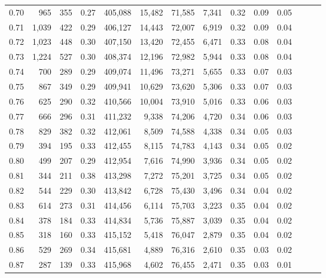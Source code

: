 \begin{tabular}{rrrrrrrrrrrrrr}
0.70 &     965 &    355 &  0.27 &  405,088 &   15,482 &  71,585 &   7,341 &  0.32 &  0.09 &      0.05 \\
0.71 &   1,039 &    422 &  0.29 &  406,127 &   14,443 &  72,007 &   6,919 &  0.32 &  0.09 &      0.04 \\
0.72 &   1,023 &    448 &  0.30 &  407,150 &   13,420 &  72,455 &   6,471 &  0.33 &  0.08 &      0.04 \\
0.73 &   1,224 &    527 &  0.30 &  408,374 &   12,196 &  72,982 &   5,944 &  0.33 &  0.08 &      0.04 \\
0.74 &     700 &    289 &  0.29 &  409,074 &   11,496 &  73,271 &   5,655 &  0.33 &  0.07 &      0.03 \\
0.75 &     867 &    349 &  0.29 &  409,941 &   10,629 &  73,620 &   5,306 &  0.33 &  0.07 &      0.03 \\
0.76 &     625 &    290 &  0.32 &  410,566 &   10,004 &  73,910 &   5,016 &  0.33 &  0.06 &      0.03 \\
0.77 &     666 &    296 &  0.31 &  411,232 &    9,338 &  74,206 &   4,720 &  0.34 &  0.06 &      0.03 \\
0.78 &     829 &    382 &  0.32 &  412,061 &    8,509 &  74,588 &   4,338 &  0.34 &  0.05 &      0.03 \\
0.79 &     394 &    195 &  0.33 &  412,455 &    8,115 &  74,783 &   4,143 &  0.34 &  0.05 &      0.02 \\
0.80 &     499 &    207 &  0.29 &  412,954 &    7,616 &  74,990 &   3,936 &  0.34 &  0.05 &      0.02 \\
0.81 &     344 &    211 &  0.38 &  413,298 &    7,272 &  75,201 &   3,725 &  0.34 &  0.05 &      0.02 \\
0.82 &     544 &    229 &  0.30 &  413,842 &    6,728 &  75,430 &   3,496 &  0.34 &  0.04 &      0.02 \\
0.83 &     614 &    273 &  0.31 &  414,456 &    6,114 &  75,703 &   3,223 &  0.35 &  0.04 &      0.02 \\
0.84 &     378 &    184 &  0.33 &  414,834 &    5,736 &  75,887 &   3,039 &  0.35 &  0.04 &      0.02 \\
0.85 &     318 &    160 &  0.33 &  415,152 &    5,418 &  76,047 &   2,879 &  0.35 &  0.04 &      0.02 \\
0.86 &     529 &    269 &  0.34 &  415,681 &    4,889 &  76,316 &   2,610 &  0.35 &  0.03 &      0.02 \\
0.87 &     287 &    139 &  0.33 &  415,968 &    4,602 &  76,455 &   2,471 &  0.35 &  0.03 &      0.01 \\

\end{tabular}
